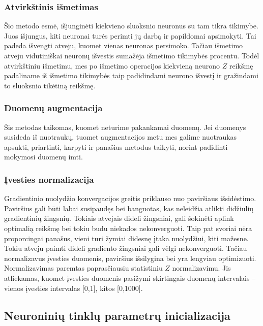 \documentclass[a4paper, 12pt]{article}
\begin{document}
%
\subsubsection{Atvirkštinis išmetimas}
%
Šio metodo esmė, išjunginėti kiekvieno sluoksnio neuronus su tam tikra tikimybe. Juos išjungus, kiti neuronai turės perimti jų darbą ir papildomai apsimokyti. Tai padeda išvengti atveju, kuomet vienas neuronas persimoko. Tačiau išmetimo atveju vidutiniškai neuronų išvestis sumažėja išmetimo tikimybės procentu. Todėl atvirkštiniu išmetimu, mes po išmetimo operacijos kiekvieną neurono $Z$ reikšmę padaliname iš išmetimo tikimybės taip padidindami neurono išvestį ir gražindami to sluoksnio tikėtiną reikšmę.



%
\subsubsection{Duomenų augmentacija}
%

Šis metodas taikomas, kuomet neturime pakankamai duomenų. Jei duomenys susideda iš nuotraukų, tuomet augmentacijos metu mes galime nuotraukas apsukti, priartinti, karpyti ir panašius metodus taikyti, norint padidinti mokymosi duomenų imti.

%
\subsubsection{Įvesties normalizacija}
%

Gradientinio nuolydžio konvergacijos greitis priklauso nuo paviršiaus išsidėstimo. Paviršius gali būti labai susipaudęs bei banguotas, kas neleidžia atlikti didžiulių gradientinių žingsnių. Tokiais atvejais dideli žingsniai, gali šokinėti aplink optimalią reikšmę bei tokiu budu niekados nekonverguoti. Taip pat svoriai nėra proporcingai panašus, vieni turi žymiai didesnę įtaka nuolydžiui, kiti mažesne. Tokiu atveju paimti dideli gradiento žingsniai gali vėlgi nekonverguoti. Tačiau normalizavus įvesties duomenis, paviršius išsilygina bei yra lengviau optimizuoti. Normalizavimas paremtas paprasčiausiu statistiniu $Z$ normalizavimu. Jis atliekamas, kuomet įvesties duomenis pasižymi skirtingais duomenų intervalais – vienos įvesties intervalas [0,1], kitos [0,1000].

%
\subsection{Neuroninių tinklų parametrų inicializacija}
%
\end{document}
